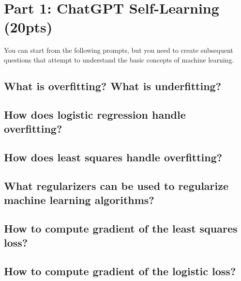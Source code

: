 \section{Part 1: ChatGPT Self-Learning (20pts)}

You can start from the following prompts, but you need to create subsequent questions that attempt to understand the basic concepts of machine learning.

\subsection{What is overfitting? What is underfitting?}

\subsection{How does logistic regression handle overfitting?}

\subsection{How does least squares handle overfitting?}

\subsection{What regularizers can be used to regularize machine learning algorithms?}

\subsection{How to compute gradient of the least squares loss?}

\subsection{How to compute gradient of the logistic loss?}